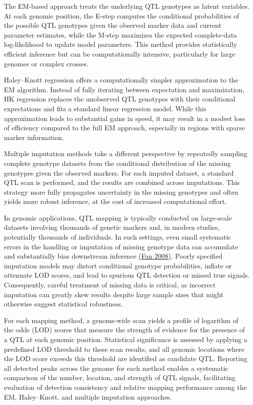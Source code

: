 \documentclass[
  12pt,
]{article}
\begin{document}
The EM-based approach treats the underlying QTL genotypes as latent
variables. At each genomic position, the E-step computes the conditional
probabilities of the possible QTL genotypes given the observed marker
data and current parameter estimates, while the M-step maximizes the
expected complete-data log-likelihood to update model parameters. This
method provides statistically efficient inference but can be
computationally intensive, particularly for large genomes or complex
crosses.

Haley--Knott regression offers a computationally simpler approximation
to the EM algorithm. Instead of fully iterating between expectation and
maximization, HK regression replaces the unobserved QTL genotypes with
their conditional expectations and fits a standard linear regression
model. While this approximation leads to substantial gains in speed, it
may result in a modest loss of efficiency compared to the full EM
approach, especially in regions with sparse marker information.

Multiple imputation methods take a different perspective by repeatedly
sampling complete genotype datasets from the conditional distribution of
the missing genotypes given the observed markers. For each imputed
dataset, a standard QTL scan is performed, and the results are combined
across imputations. This strategy more fully propagates uncertainty in
the missing genotypes and often yields more robust inference, at the
cost of increased computational effort.

In genomic applications, QTL mapping is typically conducted on
large-scale datasets involving thousands of genetic markers and, in
modern studies, potentially thousands of individuals. In such settings,
even small systematic errors in the handling or imputation of missing
genotype data can accumulate and substantially bias downstream
inference \protect\hyperlink{ref-Fan2008}{(Fan 2008)}.  Poorly specified imputation models may distort conditional
genotype probabilities, inflate or attenuate LOD scores, and lead to
spurious QTL detection or missed true signals. Consequently, careful
treatment of missing data is critical, as incorrect imputation can
greatly skew results despite large sample sizes that might otherwise
suggest statistical robustness.

For each mapping method, a genome-wide scan yields a profile of
logarithm of the odds (LOD) scores that measure the strength of evidence
for the presence of a QTL at each genomic position. Statistical
significance is assessed by applying a predefined LOD threshold to these
scan results, and all genomic locations where the LOD score exceeds this
threshold are identified as candidate QTL. Reporting all detected peaks
across the genome for each method enables a systematic comparison of the
number, location, and strength of QTL signals, facilitating evaluation
of detection consistency and relative mapping performance among the EM,
Haley--Knott, and multiple imputation approaches.
\end{document}
